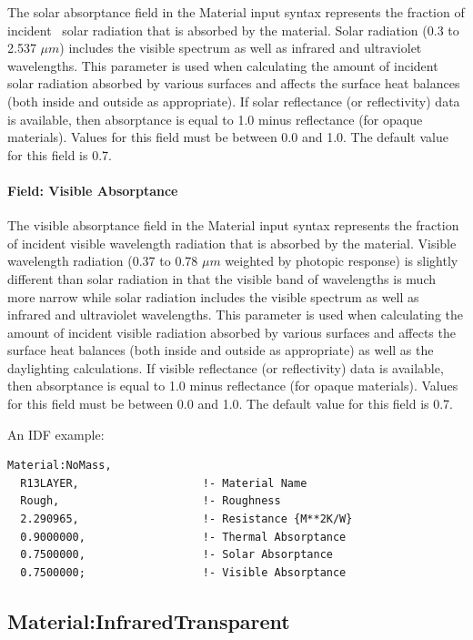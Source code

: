 The solar absorptance field in the Material input syntax represents the fraction of incident~ solar radiation that is absorbed by the material. Solar radiation (0.3 to 2.537 $\mu{}m$) includes the visible spectrum as well as infrared and ultraviolet wavelengths. This parameter is used when calculating the amount of incident solar radiation absorbed by various surfaces and affects the surface heat balances (both inside and outside as appropriate). If solar reflectance (or reflectivity) data is available, then absorptance is equal to 1.0 minus reflectance (for opaque materials). Values for this field must be between 0.0 and 1.0. The default value for this field is 0.7.

\paragraph{Field: Visible Absorptance}\label{field-visible-absorptance-1}

The visible absorptance field in the Material input syntax represents the fraction of incident visible wavelength radiation that is absorbed by the material. Visible wavelength radiation (0.37 to 0.78 $\mu{}m$ weighted by photopic response) is slightly different than solar radiation in that the visible band of wavelengths is much more narrow while solar radiation includes the visible spectrum as well as infrared and ultraviolet wavelengths. This parameter is used when calculating the amount of incident visible radiation absorbed by various surfaces and affects the surface heat balances (both inside and outside as appropriate) as well as the daylighting calculations. If visible reflectance (or reflectivity) data is available, then absorptance is equal to 1.0 minus reflectance (for opaque materials). Values for this field must be between 0.0 and 1.0. The default value for this field is 0.7.

An IDF example:

\begin{lstlisting}
Material:NoMass,
  R13LAYER,                   !- Material Name
  Rough,                      !- Roughness
  2.290965,                   !- Resistance {M**2K/W}
  0.9000000,                  !- Thermal Absorptance
  0.7500000,                  !- Solar Absorptance
  0.7500000;                  !- Visible Absorptance
\end{lstlisting}

\subsection{Material:InfraredTransparent}\label{materialinfraredtransparent}

